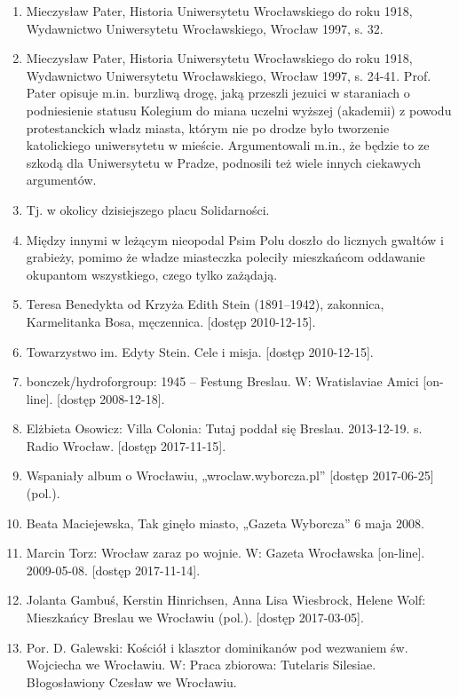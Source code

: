 \documentclass{article}
\begin{document}
\begin{enumerate}
 \item Mieczysław Pater, Historia Uniwersytetu Wrocławskiego do roku 1918, Wydawnictwo Uniwersytetu Wrocławskiego, Wrocław 1997, s. 32.\label{fig: [12]}
 \item Mieczysław Pater, Historia Uniwersytetu Wrocławskiego do roku 1918, Wydawnictwo Uniwersytetu Wrocławskiego, Wrocław 1997, s. 24-41. Prof. Pater opisuje m.in. burzliwą drogę, jaką przeszli jezuici w staraniach o podniesienie statusu Kolegium do miana uczelni wyższej (akademii) z powodu protestanckich władz miasta, którym nie po drodze było tworzenie katolickiego uniwersytetu w mieście. Argumentowali m.in., że będzie to ze szkodą dla Uniwersytetu w Pradze, podnosili też wiele innych ciekawych argumentów.\label{fig: [13]}
 \item Tj. w okolicy dzisiejszego placu Solidarności.\label{fig: [14]}
\item Między innymi w leżącym nieopodal Psim Polu doszło do licznych gwałtów i grabieży, pomimo że władze miasteczka poleciły mieszkańcom oddawanie okupantom wszystkiego, czego tylko zażądają.\label{fig: [15]}
\item Teresa Benedykta od Krzyża Edith Stein (1891–1942), zakonnica, Karmelitanka Bosa, męczennica. [dostęp 2010-12-15].\label{fig: [16]}
  \item Towarzystwo im. Edyty Stein. Cele i misja. [dostęp 2010-12-15].\label{fig: [17]}
\item bonczek/hydroforgroup: 1945 – Festung Breslau. W: Wratislaviae Amici [on-line]. [dostęp 2008-12-18].\label{fig: [18]}
 \item Elżbieta Osowicz: Villa Colonia: Tutaj poddał się Breslau. 2013-12-19. s. Radio Wrocław. [dostęp 2017-11-15].\label{fig: [19]}
\item Wspaniały album o Wrocławiu, „wroclaw.wyborcza.pl” [dostęp 2017-06-25] (pol.).\label{fig: [20]}
 \item Beata Maciejewska, Tak ginęło miasto, „Gazeta Wyborcza” 6 maja 2008.\label{fig: [21]}
 \item Marcin Torz: Wrocław zaraz po wojnie. W: Gazeta Wrocławska [on-line]. 2009-05-08. [dostęp 2017-11-14].\label{fig: [22]}
\item Jolanta Gambuś, Kerstin Hinrichsen, Anna Lisa Wiesbrock, Helene Wolf: Mieszkańcy Breslau we Wrocławiu (pol.). [dostęp 2017-03-05].\label{fig: [23]}
 \item Por. D. Galewski: Kościół i klasztor dominikanów pod wezwaniem św. Wojciecha we Wrocławiu. W: Praca zbiorowa: Tutelaris Silesiae. Błogosławiony Czesław we Wrocławiu.

\end{enumerate}
\end{document}
